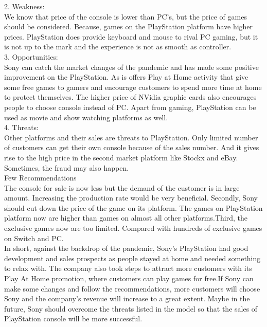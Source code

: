 \documentclass[conference]{IEEEtran}
\begin{document}
2. Weakness:\\
We know that price of the console is lower than PC's, but the price of games should be considered. Because, games on the PlayStation platform have higher prices. PlayStation does provide keyboard and mouse to rival PC gaming, but it is not up to the mark and the experience is not as smooth as controller.\\
3. Opportunities:\\
Sony can catch the market changes of the pandemic and has made some positive improvement on the PlayStation. As is offers Play at Home activity that give some free games to gamers and encourage customers to spend more time at home to protect themselves. The higher price of NVidia graphic cards also encourages people to choose console instead of PC. Apart from gaming, PlayStation can be used as movie and show watching platforms as well.\\
4. Threats:\\
Other platforms and their sales are threats to PlayStation. Only limited number of customers can get their own console because of the sales number. And it gives rise to the high price in the second market platform like Stockx and eBay. Sometimes, the fraud may also happen.\\
Few Recommendations\\
The console for sale is now less but the demand of the customer is in large amount. Increasing the production rate would be very beneficial. Secondly, Sony should cut down the price of the game on its platform. The games on PlayStation platform now are higher than games on almost all other platforms.Third, the exclusive games now are too limited. Compared with hundreds of exclusive games on Switch and PC.\\
In short, against the backdrop of the pandemic, Sony's PlayStation had good development and sales prospects as people stayed at home and needed something to relax with. The company also took steps to attract more customers with its Play At Home promotion, where customers can play games for free.If Sony can make some changes and follow the recommendations, more customers will choose Sony and the company's revenue will increase to a great extent. Maybe in the future, Sony should overcome the threats listed in the model so that the sales of PlayStation console will be more successful.
\end{document}

